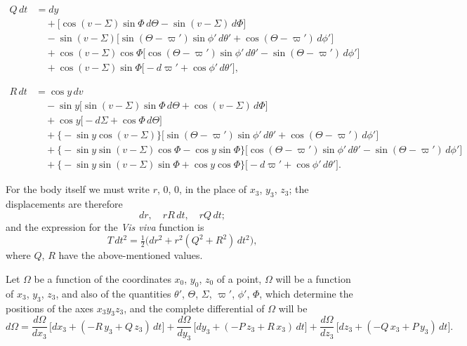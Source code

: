 \documentclass[12pt,a4paper]{article}
\theoremstyle{plain}
\begin{document}
\newpage
{}
\begin{align*}
Q\,dt &= dy\\
&\quad +\bigl[\cos(v-\varSigma)\sin\varPhi\,d\Theta-\sin(v-\varSigma)\,d\varPhi\bigr]\\
&\quad -\sin(v-\varSigma)\bigl[\sin(\Theta-\varpi')\sin\phi'\,d\theta'+\cos(\Theta-\varpi')\,d\phi'\bigr]\\
&\quad +\cos(v-\varSigma)\cos\varPhi\bigl[\cos(\Theta-\varpi')\sin\phi'\,d\theta'-\sin(\Theta-\varpi')\,d\phi'\bigr]\\
&\quad +\cos(v-\varSigma)\sin\varPhi\bigl[-d\varpi'+\cos\phi'\,d\theta'\bigr],
\end{align*}

\begin{align*}
R\,dt &= \cos y\,dv\\
&\quad -\sin y\bigl[\sin(v-\varSigma)\sin\varPhi\,d\Theta+\cos(v-\varSigma)\,d\varPhi\bigr]\\
&\quad +\cos y\bigl[-d\varSigma+\cos\varPhi\,d\Theta\bigr]\\
&\quad +\bigl\{-\sin y\cos(v-\varSigma)\bigr\}\bigl[\sin(\Theta-\varpi')\sin\phi'\,d\theta'+\cos(\Theta-\varpi')\,d\phi'\bigr]\\
&\quad +\bigl\{-\sin y\sin(v-\varSigma)\cos\varPhi-\cos y\sin\varPhi\bigr\}\bigl[\cos(\Theta-\varpi')\sin\phi'\,d\theta'-\sin(\Theta-\varpi')\,d\phi'\bigr]\\
&\quad +\bigl\{-\sin y\sin(v-\varSigma)\sin\varPhi+\cos y\cos\varPhi\bigr\}\bigl[-d\varpi'+\cos\phi'\,d\theta'\bigr].
\end{align*}

For the body itself we must write $r$, $0$, $0$, in the place of $x_{3}$, $y_{3}$, $z_{3}$; the displacements are therefore
\[
dr,\quad rR\,dt,\quad rQ\,dt;
\]
and the expression for the \textit{Vis viva} function is
\[
T\,dt^{2}=\tfrac{1}{2}\bigl(dr^{2}+r^{2}(Q^{2}+R^{2})\,dt^{2}\bigr),
\]
where $Q$, $R$ have the above-mentioned values.

\medskip
Let $\Omega$ be a function of the coordinates $x_{0}$, $y_{0}$, $z_{0}$ of a point, $\Omega$ will be a function of $x_{3}$, $y_{3}$, $z_{3}$, and also of the quantities $\theta'$, $\Theta$, $\varSigma$, $\varpi'$, $\phi'$, $\varPhi$, which determine the positions of the axes $x_{3}y_{3}z_{3}$, and the complete differential of $\Omega$ will be
\[
d\Omega=\dfrac{d\Omega}{dx_{3}}\,\bigl[dx_{3}+(-R\,y_{3}+Q\,z_{3})\,dt\bigr]
+\dfrac{d\Omega}{dy_{3}}\,\bigl[dy_{3}+(-P\,z_{3}+R\,x_{3})\,dt\bigr]
+\dfrac{d\Omega}{dz_{3}}\,\bigl[dz_{3}+(-Q\,x_{3}+P\,y_{3})\,dt\bigr].
\]
\end{document}
